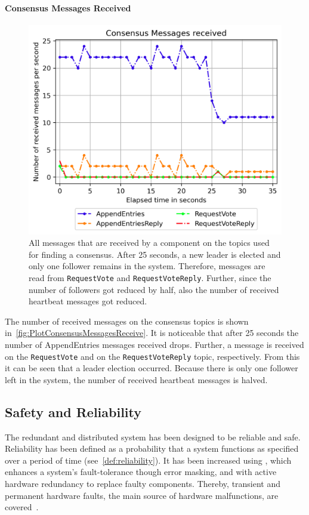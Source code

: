 \paragraph{Consensus Messages Received}

\begin{figure}[!hb]
	\centering
	\includegraphics[width=0.75\linewidth]{images/plots/ConsensusMessagesReceive}
	\caption{All messages that are received by a component on the topics used for finding a consensus. After 25 seconds, a new leader is elected and only one follower remains in the system. Therefore, messages are read from \texttt{RequestVote} and \texttt{RequestVoteReply}. Further, since the number of followers got reduced by half, also the number of received heartbeat messages got reduced.}
	\label{fig:PlotConsensusMessagesReceive}
\end{figure}

The number of received messages on the consensus topics is shown in~\autoref{fig:PlotConsensusMessagesReceive}.
It is noticeable that after 25 seconds the number of AppendEntries messages received drops.
Further, a message is received on the \texttt{RequestVote} and on the \texttt{RequestVoteReply} topic, respectively.
From this it can be seen that a leader election occurred.
Because there is only one follower left in the system, the number of received heartbeat messages is halved.

\subsection{Safety and Reliability}
The redundant and distributed system has been designed to be reliable and safe.
Reliability has been defined as a probability that a system functions as specified over a period of time (see~\autoref{def:reliability}).
It has been increased using , which enhances a system's fault-tolerance though error masking, and with active hardware redundancy to replace faulty components.
Thereby, transient and permanent hardware faults, the main source of hardware malfunctions, are covered~\cite{MULAZZANIReliabilityVsSafety}.

